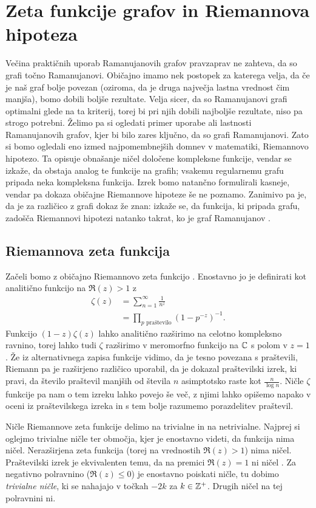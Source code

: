 \section{Zeta funkcije grafov in Riemannova hipoteza}
Večina praktičnih uporab Ramanujanovih grafov pravzaprav ne zahteva, da so grafi točno Ramanujanovi. Običajno imamo nek postopek za katerega velja, da če je naš graf bolje povezan (oziroma, da je druga največja lastna vrednost čim manjša), bomo dobili boljše rezultate. Velja sicer, da so Ramanujanovi grafi optimalni glede na ta kriterij, torej bi pri njih dobili najboljše rezultate, niso pa strogo potrebni. Želimo pa si ogledati primer uporabe ali lastnosti Ramanujanovih grafov, kjer bi bilo zares ključno, da so grafi Ramanujanovi. Zato si bomo ogledali eno izmed najpomembnejših domnev v matematiki, Riemannovo hipotezo. Ta opisuje obnašanje ničel določene kompleksne funkcije, vendar se izkaže, da obstaja analog te funkcije na grafih; vsakemu regularnemu grafu pripada neka kompleksna funkcija. Izrek bomo natančno formulirali kasneje, vendar pa dokaza običajne Riemannove hipoteze še ne poznamo. Zanimivo pa je, da je za različico z grafi dokaz že znan: izkaže se, da funkcija, ki pripada grafu, zadošča Riemannovi hipotezi natanko takrat, ko je graf Ramanujanov \cite{portablesnowbird}.

\subsection{Riemannova zeta funkcija}
Začeli bomo z običajno Riemannovo zeta funkcijo \cite{freitag1}. Enostavno jo je definirati kot analitično funkcijo na \(\Re(z)>1\) z
\begin{align*}
    \zeta(z) &= \sum_{n=1}^\infty \frac{1}{n^z} \\ 
    &= \prod_{p \text{ praštevilo}} \left(1-p^{-z}\right)^{-1}.
\end{align*}
Funkcijo \((1-z)\zeta(z)\) lahko analitično razširimo na celotno kompleksno ravnino, torej lahko tudi \(\zeta\) razširimo v meromorfno funkcijo na \(\mathbb C\) s polom v \(z=1\). Že iz alternativnega zapisa funkcije vidimo, da je tesno povezana s praštevili, Riemann pa je razširjeno različico uporabil, da je dokazal praštevilski izrek, ki pravi, da število praštevil manjših od števila \(n\) asimptotsko raste kot \(\frac{n}{\log{n}}\). Ničle \(\zeta\) funkcije pa nam o tem izreku lahko povejo še več, z njimi lahko opišemo napako v oceni iz praštevilskega izreka in s tem bolje razumemo porazdelitev praštevil.

Ničle Riemannove zeta funkcije delimo na trivialne in na netrivialne. Najprej si oglejmo trivialne ničle ter območja, kjer je enostavno videti, da funkcija nima ničel. Nerazširjena zeta funkcija (torej na vrednostih \(\Re(z) > 1\)) nima ničel. Praštevilski izrek je ekvivalenten temu, da na premici \(\Re(z) = 1\) ni ničel \cite{harolddiamond}. Za negativno polravnino (\(\Re(z) \leq 0\)) je enostavno poiskati ničle, tu dobimo \emph{trivialne ničle}, ki se nahajajo v točkah \(-2k\) za \(k\in\mathbb Z^+\). Drugih ničel na tej polravnini ni.

